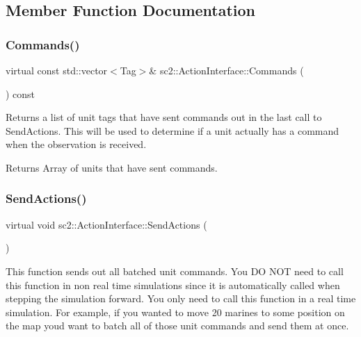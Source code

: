 \subsection{Member Function Documentation}
\mbox{\label{classsc2_1_1_action_interface_a29a55f8dd4f9230864caa1deb228ae33}} 
\subsubsection{\texorpdfstring{Commands()}{Commands()}}
{\footnotesize\ttfamily virtual const std\+::vector$<$Tag$>$\& sc2\+::\+Action\+Interface\+::\+Commands (\begin{DoxyParamCaption}{ }\end{DoxyParamCaption}) const\hspace{0.3cm}{\ttfamily [pure virtual]}}

Returns a list of unit tags that have sent commands out in the last call to Send\+Actions. This will be used to determine if a unit actually has a command when the observation is received. \begin{DoxyReturn}{Returns}
Array of units that have sent commands. 
\end{DoxyReturn}
\mbox{\label{classsc2_1_1_action_interface_af054d2a35e7eb740109f63011090ea50}} 
\subsubsection{\texorpdfstring{Send\+Actions()}{SendActions()}}
{\footnotesize\ttfamily virtual void sc2\+::\+Action\+Interface\+::\+Send\+Actions (\begin{DoxyParamCaption}{ }\end{DoxyParamCaption})\hspace{0.3cm}{\ttfamily [pure virtual]}}

This function sends out all batched unit commands. You DO N\+OT need to call this function in non real time simulations since it is automatically called when stepping the simulation forward. You only need to call this function in a real time simulation. For example, if you wanted to move 20 marines to some position on the map you\textquotesingle{}d want to batch all of those unit commands and send them at once. \mbox{\label{classsc2_1_1_action_interface_a5f66f9b7eaf1d6a681694927b8605004}} 
